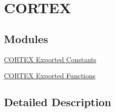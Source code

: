 \hypertarget{group___c_o_r_t_e_x___l_l}{}\section{C\+O\+R\+T\+EX}
\label{group___c_o_r_t_e_x___l_l}
\subsection*{Modules}
\begin{DoxyCompactItemize}
\item 
\hyperlink{group___c_o_r_t_e_x___l_l___exported___constants}{C\+O\+R\+T\+E\+X Exported Constants}
\item 
\hyperlink{group___c_o_r_t_e_x___l_l___exported___functions}{C\+O\+R\+T\+E\+X Exported Functions}
\end{DoxyCompactItemize}


\subsection{Detailed Description}

